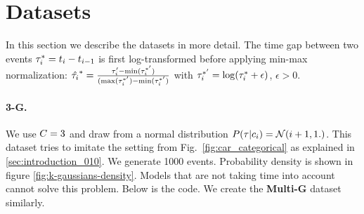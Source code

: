 \section{Datasets}\label{datasets}

In this section we describe the datasets in more detail. The time gap between two events $\tau^*_i = t_i - t_{i-1}$ is first log-transformed before applying min-max normalization: $\hat{\tau_i}^* = \frac{\tau_i' - \min(\tau_i^{*'})}{(\max(\tau_i^{*'}) - \min(\tau_i^{*'})}$ with $\tau_i^{*'} = \log(\tau_i^* + \epsilon)$, $\epsilon > 0$.

\paragraph{3-G.} We use $C=3$ and draw from a normal distribution  $P(\tau | c_i) = \mathcal{N}(i + 1, 1.)$. This dataset tries to imitate the setting from Fig.\ \ref{fig:car_categorical} as explained in \ref{sec:introduction_010}. We generate 1000 events. Probability density is shown in figure \ref{fig:k-gaussians-density}. Models that are not taking time into account cannot solve this problem. Below is the code. We create the \textbf{Multi-G} dataset similarly.\vfill

